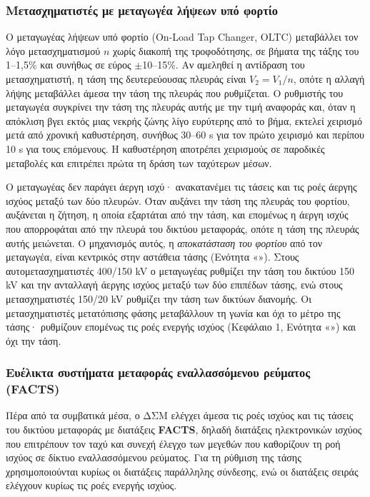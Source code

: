 \subsubsection{Μετασχηματιστές με μεταγωγέα λήψεων υπό φορτίο}
\label{sec:oltc}

Ο μεταγωγέας λήψεων υπό φορτίο (On-Load Tap Changer, OLTC) μεταβάλλει τον λόγο
μετασχηματισμού $n$ χωρίς διακοπή της τροφοδότησης, σε βήματα της τάξης του 1--1,5\% και
συνήθως σε εύρος $\pm$10--15\%. Αν αμεληθεί η αντίδραση του μετασχηματιστή, η τάση της
δευτερεύουσας πλευράς είναι $V_2 = V_1/n$, οπότε η αλλαγή λήψης μεταβάλλει άμεσα την τάση
της πλευράς που ρυθμίζεται. Ο ρυθμιστής του μεταγωγέα συγκρίνει την τάση της πλευράς αυτής με
την τιμή αναφοράς και, όταν η απόκλιση βγει εκτός μιας νεκρής ζώνης λίγο ευρύτερης από το
βήμα, εκτελεί χειρισμό μετά από χρονική καθυστέρηση, συνήθως 30--60 s για τον πρώτο χειρισμό
και περίπου 10 s για τους επόμενους. Η καθυστέρηση αποτρέπει χειρισμούς σε παροδικές
μεταβολές και επιτρέπει πρώτα τη δράση των ταχύτερων μέσων.

Ο μεταγωγέας δεν παράγει άεργη ισχύ· ανακατανέμει τις τάσεις και τις ροές άεργης ισχύος
μεταξύ των δύο πλευρών. Όταν αυξάνει την τάση της πλευράς του φορτίου, αυξάνεται η ζήτηση, η
οποία εξαρτάται από την τάση, και επομένως η άεργη ισχύς που απορροφάται από την πλευρά του
δικτύου μεταφοράς, οπότε η τάση της πλευράς αυτής μειώνεται. Ο μηχανισμός αυτός, η
\emph{αποκατάσταση του φορτίου} από τον μεταγωγέα, είναι κεντρικός στην αστάθεια τάσης
(Ενότητα «»). Στους αυτομετασχηματιστές 400/150 kV ο μεταγωγέας
ρυθμίζει την τάση του δικτύου 150 kV και την ανταλλαγή άεργης ισχύος μεταξύ των δύο επιπέδων
τάσης, ενώ στους μετασχηματιστές 150/20 kV ρυθμίζει την τάση των δικτύων διανομής. Οι
μετασχηματιστές μετατόπισης φάσης μεταβάλλουν τη γωνία και όχι το μέτρο της τάσης· ρυθμίζουν
επομένως τις ροές ενεργής ισχύος (Κεφάλαιο 1, Ενότητα «») και όχι την τάση.

\subsubsection{Ευέλικτα συστήματα μεταφοράς εναλλασσόμενου ρεύματος (FACTS)}
\label{sec:facts}

Πέρα από τα συμβατικά μέσα, ο ΔΣΜ ελέγχει άμεσα τις ροές ισχύος και τις τάσεις του δικτύου
μεταφοράς με διατάξεις \textbf{FACTS}, δηλαδή διατάξεις ηλεκτρονικών ισχύος που επιτρέπουν τον
ταχύ και συνεχή έλεγχο των μεγεθών που καθορίζουν τη ροή ισχύος σε δίκτυο εναλλασσόμενου
ρεύματος. Για τη ρύθμιση της τάσης χρησιμοποιούνται κυρίως οι διατάξεις παράλληλης σύνδεσης,
ενώ οι διατάξεις σειράς ελέγχουν κυρίως τις ροές ενεργής ισχύος.

